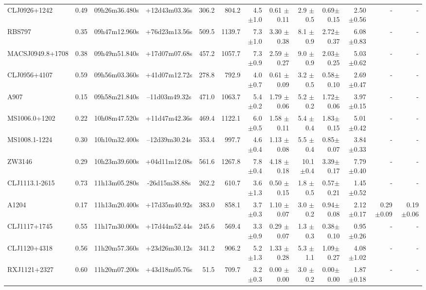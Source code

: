 \documentclass{aa}
\begin{document}
\begin{landscape}
\begin{longtable}{lcccrrrrrrrrr}
CLJ0926+1242	 &0.49 & 09h26m36.480s &+12d43m03.36s  &  306.2   &  804.2   &  4.5  $\pm$1.0 & 0.61 $\pm$ 0.11&2.9  $\pm$0.5  & 0.69$\pm$0.15& 2.50 $\pm$0.56& - & -   \\
RBS797 	 &0.35 & 09h47m12.960s &+76d23m13.56s  &  509.5   &  1139.7  &  7.3  $\pm$1.0 & 3.30 $\pm$ 0.38&8.1  $\pm$0.9  & 2.72$\pm$0.37& 6.08 $\pm$0.83& - & -   \\
MACSJ0949.8+1708 &0.38 & 09h49m51.840s &+17d07m07.68s  &  457.2   &  1057.7  &  7.3  $\pm$0.9 & 2.59 $\pm$ 0.27&9.0  $\pm$0.9  & 2.03$\pm$0.25& 5.03 $\pm$0.62& - & -   \\
CLJ0956+4107	 &0.59 & 09h56m03.360s &+41d07m12.72s  &  278.8   &  792.9   &  4.0  $\pm$0.7 & 0.61 $\pm$ 0.09&3.2  $\pm$0.5  & 0.58$\pm$0.10& 2.69 $\pm$0.47& - & -   \\
A907		 &0.15 & 09h58m21.840s &--11d03m49.32s  &  471.0   &  1063.7  &  5.4  $\pm$0.2 & 1.79 $\pm$ 0.06&5.2  $\pm$0.2  & 1.72$\pm$0.06& 3.97 $\pm$0.15& - & -   \\
MS1006.0+1202   &0.22 & 10h08m47.520s &+11d47m42.36s  &  469.4   &  1122.1  &  6.0  $\pm$0.5 & 1.58 $\pm$ 0.11&5.4  $\pm$0.4  & 1.83$\pm$0.15& 5.01 $\pm$0.42& - & -   \\
MS1008.1-1224   &0.30 & 10h10m32.400s &--12d39m30.24s  &  353.4   &  997.7   &  4.6  $\pm$0.4 & 1.13 $\pm$ 0.08&5.5  $\pm$0.4  & 0.85$\pm$0.07& 3.84 $\pm$0.33& - & -   \\
ZW3146 	 &0.29 & 10h23m39.600s &+04d11m12.08s  &  561.6   &  1267.8  &  7.8  $\pm$0.4 & 4.18 $\pm$ 0.18&10.1 $\pm$0.4  & 3.39$\pm$0.17& 7.79 $\pm$0.40& - & -   \\
CLJ1113.1-2615  &0.73 & 11h13m05.280s &-26d15m38.88s  &  262.2   &  610.7   &  3.6  $\pm$1.3 & 0.50 $\pm$ 0.15&1.8  $\pm$0.5  & 0.57$\pm$0.21& 1.45 $\pm$0.52& - & -   \\
A1204   	 &0.17 &11h13m20.400s  & +17d35m40.92s &  383.0   &  858.1   &  3.7  $\pm$0.3 & 1.10 $\pm$ 0.07&3.0  $\pm$0.2  & 0.94$\pm$0.08& 2.12 $\pm$0.17& 0.29 $\pm$0.09 & 0.19 $\pm$0.06  \\
CLJ1117+1745	 &0.55 & 11h17m30.000s &+17d44m52.44s  &  245.6   &  569.4   &  3.3  $\pm$0.9 & 0.29 $\pm$ 0.07&1.3  $\pm$0.3  & 0.38$\pm$0.10& 0.95 $\pm$0.26& - & -   \\
CLJ1120+4318	 &0.56 & 11h20m57.360s &+23d26m30.12s  &  341.2   &  906.2   &  5.2  $\pm$1.3 & 1.33 $\pm$ 0.28&5.3  $\pm$1.1  & 1.09$\pm$0.27& 4.08 $\pm$1.02& - & -   \\
RXJ1121+2327	 &0.60 & 11h20m07.200s &+43d18m05.76s  &  51.5    &  709.7   &  3.2  $\pm$0.3 & 0.00 $\pm$ 0.00&3.0  $\pm$0.2  & 0.00$\pm$0.00& 1.87 $\pm$0.18& - & -   \\

\end{longtable}
\end{landscape}
\end{document}

